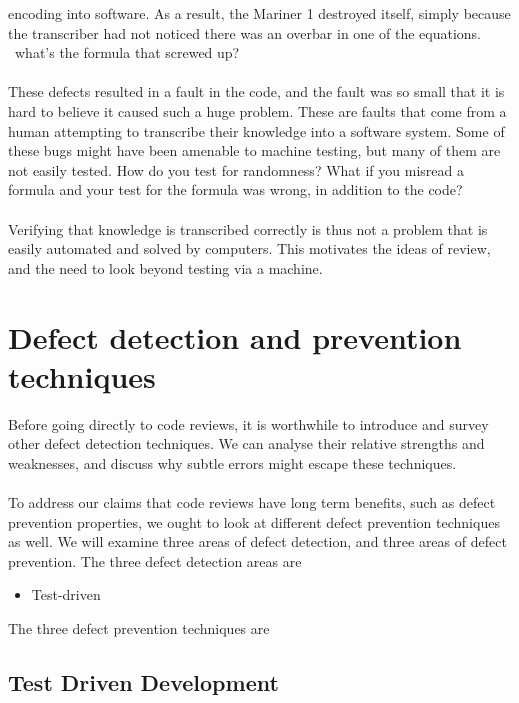 encoding into software.
As a result, the Mariner 1 destroyed itself, simply because the transcriber had not noticed there
was an overbar in one of the equations.
\FIXME\ what's the formula that screwed up?\\
\\
These defects resulted in a fault in the code, and the fault was so small that it is hard to believe
it caused such a huge problem.
These are faults that come from a human attempting to transcribe their knowledge into a software
system.
Some of these bugs might have been amenable to machine testing, but many of them are not easily
tested.
How do you test for randomness?
What if you misread a formula and your test for the formula was wrong, in addition to the code?\\
\\
Verifying that knowledge is transcribed correctly is thus not a problem that is easily automated and
solved by computers.
This motivates the ideas of review, and the need to look beyond testing via a machine.

\section{Defect detection and prevention techniques} \label{sec:litsurvey:defTechs}

Before going directly to code reviews, it is worthwhile to introduce and survey other defect
detection techniques.
We can analyse their relative strengths and weaknesses, and discuss why subtle
errors might escape these techniques.\\
\\
To address our claims that code reviews have long term benefits, such as defect
prevention properties, we ought to look at different defect prevention
techniques as well.
We will examine three areas of defect detection, and three areas of defect
prevention.
The three defect detection areas are
\begin{itemize}
  \item Test-driven
\end{itemize}
The three defect prevention techniques are
\begin{itemize}

\end{itemize}

\subsection{Test Driven Development} \label{subsec:litsurvey:testDD}

